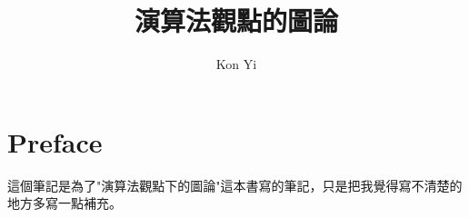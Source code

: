 \documentclass[a4paper,oneside]{scrbook}
\author{Kon Yi}
\title{演算法觀點的圖論}
\begin{document}
\maketitle

\chapter*{Preface}

這個筆記是為了"演算法觀點下的圖論"這本書寫的筆記，只是把我覺得寫不清楚的地方多寫一點補充。

\newpage

\tableofcontents

\newpage


\newpage

%

\end{document}
